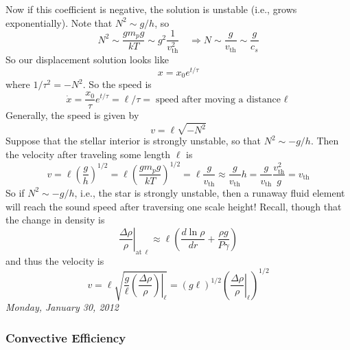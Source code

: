 \documentclass[10pt]{article}
\numberwithin{equation}{section}
\newcommand{\n}{\noindent}
\begin{document}
\n Now if this coefficient is negative, the solution is unstable
(i.e., grows exponentially). Note that $N^2\sim g/h$, so 
\begin{equation}
  \label{eq:30}
  N^2\sim\frac{gm_p
    g}{kT}\sim g^2\frac{1}{v_{\mathrm{th}}^2}\quad\Rightarrow N\sim \frac
{g}{v_{\mathrm{th}}}\sim\frac{g}{c_s}
\end{equation}
So our displacement solution looks like
\begin{equation}
  \label{eq:31}
  x=x_0e^{t/\tau}
\end{equation}
where $1/\tau^2=-N^2$. So the speed is 
\begin{equation}
  \label{eq:32}
  \dot{x}=\frac{x_0}{\tau}e^{t/\tau}=\ell/\tau=\textrm{speed after
    moving a distance $\ell$}
\end{equation}
Generally, the speed is given by
\begin{equation}
  \label{eq:33}
  v=\ell\sqrt{-N^2}
\end{equation}
Suppose that the stellar interior is strongly unstable, so that
$N^2\sim-g/h$. Then the velocity after traveling some length $\ell$ is 
\begin{equation}
  \label{eq:34}
  v=\ell\left(\frac{g}{h}\right)^{1/2}=\ell\left(\frac{gm_pg}{kT}\right)^
{1/2}=\ell\frac{g}{v_{\mathrm{th}}}\approx \frac{g}{v_{\mathrm{th}}}h=\frac
{g}{v_{\mathrm{th}}}\frac{v_{\mathrm{th}}^2}{g}=v_{\mathrm{th}}
\end{equation}
So if $N^2\sim -g/h$, i.e., the star is strongly unstable, then a runaway
fluid element will reach the sound speed after traversing one scale
height! Recall, though that the change in density is
\begin{equation}
  \label{eq:35}
 \left. \frac{\Delta\rho}{\rho}\right|_{\mathrm{at\ \ell}}\approx
 \ell\left(\frac{d\ln \rho}{dr}+\frac{\rho g}{P\gamma}\right)
\end{equation}
and thus the velocity is
\begin{equation}
  \label{eq:36}
  v=\ell\sqrt{\left.\frac{g}{\ell}\left(\frac{\Delta
        \rho}{\rho}\right)\right|_{\ell}}=(g\ell)^{1/2}\left(\left.\frac
{\Delta \rho}{\rho}\right|_{\ell}\right)^{1/2}
\end{equation}
\textit{Monday, January 30, 2012}\\

\subsubsection{Convective Efficiency}
\label{sec:conv-effic}
\end{document}
